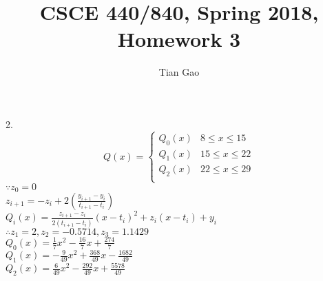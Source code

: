 \documentclass[a4paper]{article}
\title{CSCE 440/840, Spring 2018, Homework 3}
\author{Tian Gao}
\begin{document}
\maketitle


2.\\
$$Q(x)=
\begin{cases}
Q_0(x)& 8 \leqslant x \leqslant 15\\
Q_1(x)& 15 \leqslant x \leqslant 22\\
Q_2(x)& 22 \leqslant x \leqslant 29\\
\end{cases}$$
$\because z_0=0$\\
$z_{i+1} = -z_i + 2(\frac{y_{i+1} - y_i}{t_{i+1} - t_i})$\\
$Q_i(x) = \frac{z_{i+1} - z_i}{2(t_{i+1} - t_i)}(x-t_i)^2 + z_i (x-t_i) + y_i$\\
$\therefore z_1 = 2, z_2 = -0.5714, z_3 = 1.1429$\\
$Q_0(x) = \frac{1}{7}x^2 - \frac{16}{7}x + \frac{274}{7}$\\
$Q_1(x) = -\frac{9}{49}x^2 + \frac{368}{49}x -\frac{1682}{49}$\\
$Q_2(x) = \frac{6}{49}x^2 -\frac{292}{49}x + \frac{5578}{49}$\\
\end{document}
